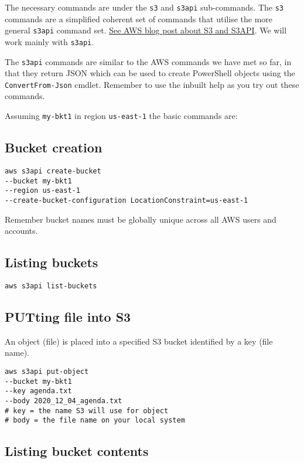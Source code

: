 \documentclass{pgnotes}
\begin{document}
The necessary commands are under the \texttt{s3} and \texttt{s3api} sub-commands.
The \texttt{s3} commands are a simplified coherent set of commands that utilise the more general \texttt{s3api} command set.
\href{https://aws.amazon.com/blogs/developer/leveraging-the-s3-and-s3api-commands/}{See AWS blog post about S3 and S3API}.
We will work mainly with \texttt{s3api}.

The \texttt{s3api} commands are similar to the AWS commands we have met so far, in that they return JSON which can be used to create PowerShell objects using the \texttt{ConvertFrom-Json} cmdlet.
Remember to use the inbuilt help as you try out these commands.

Assuming \texttt{my-bkt1} in region \texttt{us-east-1} the basic commands are: 

\subsection{Bucket creation} 

\begin{verbatim}
aws s3api create-bucket 
--bucket my-bkt1 
--region us-east-1 
--create-bucket-configuration LocationConstraint=us-east-1
\end{verbatim}

Remember bucket names must be globally unique across all AWS users and accounts.

\subsection{Listing buckets}

\begin{verbatim}
aws s3api list-buckets
\end{verbatim}

\subsection{PUTting file into S3}

An object (file) is placed into a specified S3 bucket identified by a key (file name).

\begin{verbatim}
aws s3api put-object 
--bucket my-bkt1  
--key agenda.txt  
--body 2020_12_04_agenda.txt
# key = the name S3 will use for object 
# body = the file name on your local system
\end{verbatim}

\subsection{Listing bucket contents}
\end{document}
